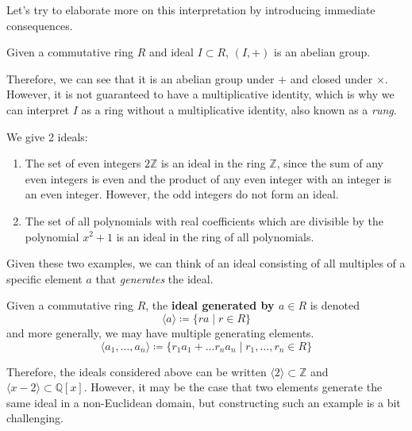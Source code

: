   Let's try to elaborate more on this interpretation by introducing immediate consequences. 

  \begin{lemma}
    Given a commutative ring $R$ and ideal $I \subset R$, $(I, +)$ is an abelian group. 
  \end{lemma}

  Therefore, we can see that it is an abelian group under $+$ and closed under $\times$. However, it is not guaranteed to have a multiplicative identity, which is why we can interpret $I$ as a ring without a multiplicative identity, also known as a \textit{rung}. 

  \begin{example}
    We give 2 ideals: 
    \begin{enumerate}
      \item The set of even integers $2 \mathbb{Z}$ is an ideal in the ring $\mathbb{Z}$, since the sum of any even integers is even and the product of any even integer with an integer is an even integer. However, the odd integers do not form an ideal. 
      \item The set of all polynomials with real coefficients which are divisible by the polynomial $x^2 + 1$ is an ideal in the ring of all polynomials. 
    \end{enumerate}
  \end{example}

  Given these two examples, we can think of an ideal consisting of all multiples of a specific element $a$ that \textit{generates} the ideal. 

  \begin{definition}
    Given a commutative ring $R$, the \textbf{ideal generated by $a \in R$} is denoted 
    \begin{equation}
      \langle a \rangle \coloneqq \{r a \mid r \in R\}
    \end{equation}
    and more generally, we may have multiple generating elements. 
    \begin{equation}
      \langle a_1, \ldots, a_n \rangle \coloneqq \{ r_1 a_1 + \ldots r_n a_n \mid r_1, \ldots, r_n \in R \}
    \end{equation}
  \end{definition}

  Therefore, the ideals considered above can be written $\langle 2 \rangle \subset \mathbb{Z}$ and $\langle x - 2 \rangle \subset \mathbb{Q}[x]$. However, it may be the case that two elements generate the same ideal in a non-Euclidean domain, but constructing such an example is a bit challenging.   

